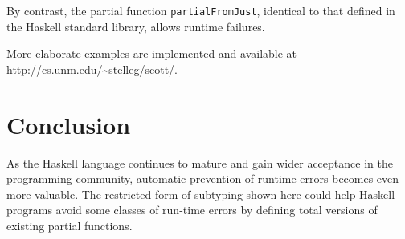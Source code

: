 \documentclass[]{article}
\newenvironment{Shaded}{}{}
\newcommand{\KeywordTok}[1]{\textcolor[rgb]{0.00,0.44,0.13}{\textbf{{#1}}}}
\newcommand{\DataTypeTok}[1]{\textcolor[rgb]{0.56,0.13,0.00}{{#1}}}
\newcommand{\StringTok}[1]{\textcolor[rgb]{0.25,0.44,0.63}{{#1}}}
\newcommand{\OtherTok}[1]{\textcolor[rgb]{0.00,0.44,0.13}{{#1}}}
\newcommand{\FunctionTok}[1]{\textcolor[rgb]{0.02,0.16,0.49}{{#1}}}
\newcommand{\NormalTok}[1]{{#1}}
\begin{document}
\begin{Shaded}
\end{Shaded}

By contrast, the partial function \texttt{partialFromJust}, identical to
that defined in the Haskell standard library, allows runtime failures.

\begin{Shaded}
\end{Shaded}

More elaborate examples are implemented and available at
\url{http://cs.unm.edu/~stelleg/scott/}.

\section{Conclusion}\label{conclusion}

As the Haskell language continues to mature and gain wider acceptance in
the programming community, automatic prevention of runtime errors
becomes even more valuable. The restricted form of subtyping shown here
could help Haskell programs avoid some classes of run-time errors by
defining total versions of existing partial functions.


\end{document}

